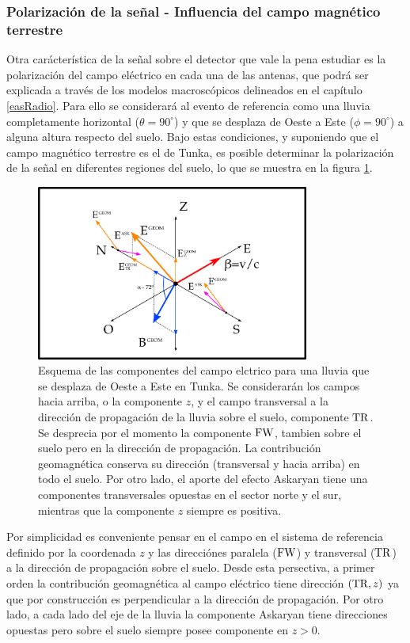 	\subsubsection{Polarización de la señal - Influencia del campo magn\'etico terrestre}
	
	Otra car\'acter\'istica de la se\~nal sobre el detector que vale la pena estudiar es la polarizaci\'on del campo el\'ectrico en cada una de las antenas, que podr\'a ser explicada a trav\'es de los modelos macrosc\'opicos delineados en el cap\'itulo \ref{easRadio}.
	Para ello se considerar\'a al evento de referencia como una lluvia completamente horizontal ($\theta=90^\circ$) y que se desplaza de Oeste a Este ($\phi=90^\circ$) a alguna altura respecto del suelo.
	Bajo estas condiciones, y suponiendo que el campo magn\'etico terrestre es el de Tunka, es posible determinar la polarizaci\'on de la se\~nal en diferentes regiones del suelo, lo que se muestra en la figura \ref{fig:malField}.
	\begin{figure}[ht!]
		\centering
		\includegraphics[width=0.8\textwidth]{./fig/simulacionRadio/malField}
		\caption{\label{fig:malField}
		Esquema de las componentes del campo elctrico para una lluvia que se desplaza de Oeste a Este en Tunka. Se considerarán los campos hacia arriba, o la componente $z$, y el campo transversal a la dirección de propagación de la lluvia sobre el suelo, componente ${\rm TR}$. Se desprecia por el momento la componente ${\rm FW}$, tambien sobre el suelo pero en la dirección de propagación. La contribución geomagnética conserva su dirección (transversal y hacia arriba) en todo el suelo. Por otro lado, el aporte del efecto Askaryan tiene una componentes transversales opuestas en el sector norte y el sur, mientras que la componente $z$ siempre es positiva.
		}
	\end{figure}
	
	Por simplicidad es conveniente pensar en el campo en el sistema de referencia definido por la coordenada $z$ y las direcciónes paralela (${\rm FW}$) y transversal (${\rm TR}$) a la dirección de propagación sobre el suelo.
	Desde esta persectiva, a primer orden la contribución geomagnética al campo eléctrico tiene dirección $({\rm TR},z)$ ya que por construcción es perpendicular a la dirección de propagación.
	Por otro lado, a cada lado del eje de la lluvia la componente Askaryan tiene direcciones opuestas pero sobre el suelo siempre posee componente en $z>0$.
	
